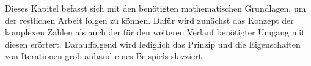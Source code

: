 
Dieses Kapitel befasst sich mit den ben\"otigten mathematischen Grundlagen, um
der restlichen Arbeit folgen zu k\"onnen.
Daf\"ur wird zun\"achst das Konzept der komplexen Zahlen als auch der f\"ur den weiteren
Verlauf ben\"otigter Umgang mit diesen er\"ortert.
Darauffolgend wird lediglich das Prinzip und die Eigenschaften von Iterationen grob
anhand eines Beispiels skizziert.


